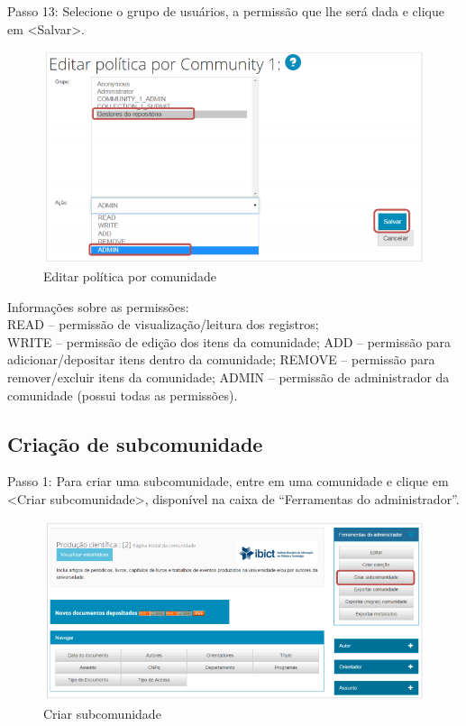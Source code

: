 \documentclass[12pt,hidelinks]{article}
\begin{document}
    Passo 13: Selecione o grupo de usuários, a permissão que lhe será dada e clique em <Salvar>.
    
    \begin{figure}[!htp]
                \centering
                \includegraphics[scale=0.8]{figura/Figura30.png}
                \caption{Editar política por comunidade}
            \label{Rotulo}
        \end{figure}

\newpage
    Informações sobre as permissões:\\
    READ – permissão de visualização/leitura dos registros; \\
    WRITE – permissão de edição dos itens da comunidade;
    ADD – permissão para adicionar/depositar itens dentro da comunidade;
    REMOVE – permissão para remover/excluir itens da comunidade;
    ADMIN – permissão de administrador da comunidade (possui todas as permissões).
    
  \subsection{Criação de subcomunidade}  
  
  Passo 1: Para criar uma subcomunidade, entre em uma comunidade e clique em <Criar subcomunidade>, disponível na caixa de “Ferramentas do administrador”.
  
  \begin{figure}[!htp]
                \centering
                \includegraphics[scale=0.8]{figura/Figura31.png}
                \caption{Criar subcomunidade}
            \label{Rotulo}
        \end{figure}
    
\end{document}
